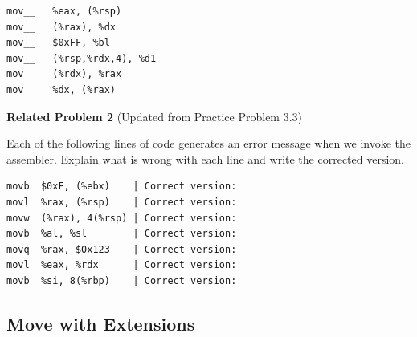 \documentclass{article}
\begin{document}
\vspace{10pt}

\begin{lstlisting}[basicstyle=\ttfamily, frame=none]
mov__   %eax, (%rsp)        
mov__   (%rax), %dx         
mov__   $0xFF, %bl          
mov__   (%rsp,%rdx,4), %d1  
mov__   (%rdx), %rax        
mov__   %dx, (%rax)        
\end{lstlisting} 
%
\noindent\textbf{Related Problem 2} (Updated from Practice Problem 3.3)

\vspace{5pt}

Each of the following lines of code generates an error message when we invoke the assembler. Explain what is wrong with each line and write the corrected version.

\vspace{10pt}

\begin{lstlisting}[basicstyle=\ttfamily, frame=none]
movb  $0xF, (%ebx)    | Correct version: 
movl  %rax, (%rsp)    | Correct version:
movw  (%rax), 4(%rsp) | Correct version:
movb  %al, %sl        | Correct version:
movq  %rax, $0x123    | Correct version:
movl  %eax, %rdx      | Correct version:
movb  %si, 8(%rbp)    | Correct version:
\end{lstlisting}

\clearpage %

\subsection{Move with Extensions}
\end{document}
